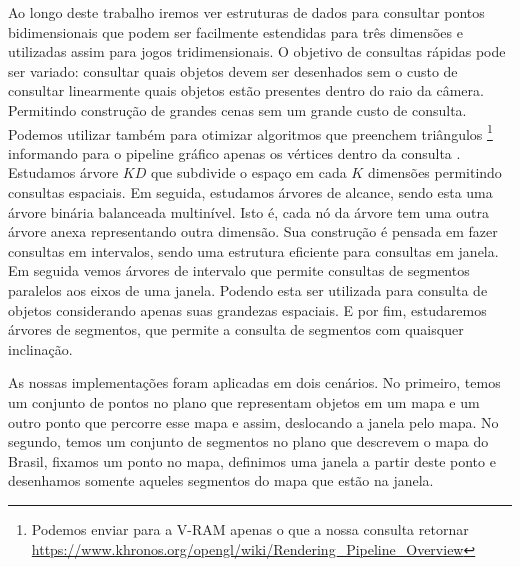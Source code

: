Ao longo deste trabalho iremos ver estruturas de dados para consultar pontos bidimensionais que podem ser facilmente estendidas para três dimensões e utilizadas assim para jogos tridimensionais. O objetivo de consultas rápidas pode ser variado: consultar quais objetos devem ser desenhados sem o custo de consultar linearmente quais objetos estão presentes dentro do raio da câmera. Permitindo construção de grandes cenas sem um grande custo de consulta. Podemos utilizar também para otimizar algoritmos que preenchem triângulos \footnote{Podemos enviar para a V-RAM apenas o que a nossa consulta retornar \url{https://www.khronos.org/opengl/wiki/Rendering_Pipeline_Overview}} informando para o pipeline gráfico apenas os vértices dentro da consulta \cite{opengl}. Estudamos árvore $KD$ que subdivide o espaço em cada $K$ dimensões permitindo consultas espaciais.%
Em seguida, estudamos árvores de alcance, sendo esta uma árvore binária balanceada multinível. Isto é, cada nó da árvore tem uma outra árvore anexa representando outra dimensão. Sua construção é pensada em fazer consultas em intervalos, sendo uma estrutura eficiente para consultas em janela. Em seguida vemos árvores de intervalo que permite consultas de segmentos paralelos aos eixos de uma janela. Podendo esta ser utilizada para consulta de objetos considerando apenas suas grandezas espaciais. E por fim, estudaremos árvores de segmentos, que permite a consulta de segmentos com quaisquer inclinação. %

As nossas implementações foram aplicadas em dois cenários. No primeiro, temos um conjunto de pontos no plano que representam objetos em um mapa e um outro ponto que percorre esse mapa e assim, deslocando a janela pelo mapa. No segundo, temos um conjunto de segmentos no plano que descrevem o mapa do Brasil, fixamos um ponto no mapa, definimos uma janela a partir deste ponto e desenhamos somente aqueles segmentos do mapa que estão na janela.






